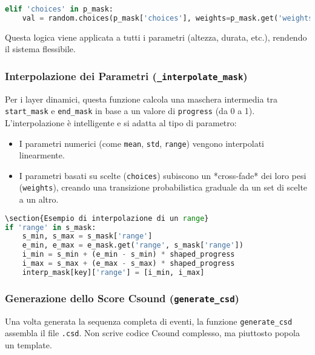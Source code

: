 \begin{lstlisting}[language=Python]
elif 'choices' in p_mask:
    val = random.choices(p_mask['choices'], weights=p_mask.get('weights'), k=1)[0]
\end{lstlisting}

Questa logica viene applicata a tutti i parametri (altezza, durata, etc.), rendendo il sistema flessibile.
\subsubsection{Interpolazione dei Parametri (\texttt{\_interpolate\_mask})}
Per i layer dinamici, questa funzione calcola una maschera intermedia tra \texttt{start\_mask} e \texttt{end\_mask} in base a un valore di \texttt{progress} (da 0 a 1). L'interpolazione è intelligente e si adatta al tipo di parametro:
\begin{itemize}
 \item I parametri numerici (come \texttt{mean}, \texttt{std}, \texttt{range}) vengono interpolati linearmente.
 \item I parametri basati su scelte (\texttt{choices}) subiscono un *cross-fade* dei loro pesi (\texttt{weights}), creando una transizione probabilistica graduale da un set di scelte a un altro.
\end{itemize}

\begin{lstlisting}[language=Python]
\section{Esempio di interpolazione di un range}
if 'range' in s_mask:
    s_min, s_max = s_mask['range']
    e_min, e_max = e_mask.get('range', s_mask['range'])
    i_min = s_min + (e_min - s_min) * shaped_progress
    i_max = s_max + (e_max - s_max) * shaped_progress
    interp_mask[key]['range'] = [i_min, i_max]
\end{lstlisting}
\subsubsection{Generazione dello Score Csound (\texttt{generate\_csd})}
Una volta generata la sequenza completa di eventi, la funzione \texttt{generate\_csd} assembla il file \texttt{.csd}. Non scrive codice Csound complesso, ma piuttosto popola un template.

